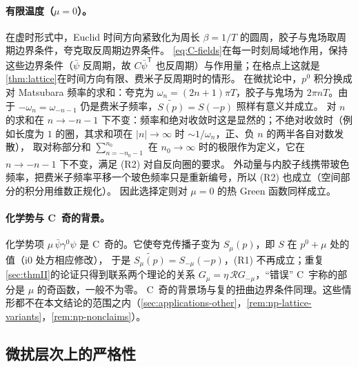 \documentclass[UTF8,a4paper,11pt,fontset=fandol]{ctexart}
\theoremstyle{cplain}
\theoremstyle{cdefinition}
\theoremstyle{cremark}
\numberwithin{equation}{section}
\newcommand{\tp}{\mathsf{T}}                         %
\newcommand{\Rop}{\mathcal{R}}                       %
\newcommand{\ii}{\mathrm{i}}                        %
\newcommand{\Cconj}[1]{\widetilde{#1}}              %
\begin{document}
\paragraph{有限温度（$\mu=0$）。}在虚时形式中，Euclid 时间方向紧致化为周长 $\beta=1/T$ 的圆周，胶子与鬼场取周期边界条件，夸克取反周期边界条件。
\cref{eq:C-fields}在每一时刻局域地作用，保持这些边界条件（$\bar\psi$ 反周期，故 $C\bar\psi^{\tp}$ 也反周期）与作用量；在格点上这就是\cref{thm:lattice}在时间方向有限、费米子反周期时的情形。
在微扰论中，$p^0$ 积分换成对 Matsubara 频率的求和：夸克为 $\omega_n=(2n+1)\pi T$，胶子与鬼场为 $2\pi nT$。由于 $-\omega_n=\omega_{-n-1}$ 仍是费米子频率，$\Cconj{S(p)}=S(-p)$ 照样有意义并成立。
对 $n$ 的求和在 $n\to-n-1$ 下不变：频率和绝对收敛时这是显然的；不绝对收敛时（例如长度为 $1$ 的圈，其求和项在 $|n|\to\infty$ 时 $\sim1/\omega_n$，正、负 $n$ 的两半各自对数发散），
取对称部分和 $\sum_{n=-n_0-1}^{n_0}$ 在 $n_0\to\infty$ 时的极限作为定义，它在 $n\to-n-1$ 下不变，满足 (R2) 对自反向圈的要求。
外动量与内胶子线携带玻色频率，把费米子频率平移一个玻色频率只是重新编号，所以 (R2) 也成立（空间部分的积分用维数正规化）。
因此选择定则对 $\mu=0$ 的热 Green 函数同样成立。

\paragraph{化学势与 C~奇的背景。}化学势项 $\mu\,\bar\psi\gamma^0\psi$ 是 C~奇的。它使夸克传播子变为 $S_\mu(p)$，即 $S$ 在 $p^0+\mu$ 处的值（$\ii0$ 处方相应修改），
于是 $\Cconj{S_\mu(p)}=S_{-\mu}(-p)$，(R1) 不再成立；重复\cref{sec:thmII}的论证只得到联系两个理论的关系 $G_\mu=\eta\,\Rop G_{-\mu}$，“错误” C~宇称的部分是 $\mu$ 的奇函数，一般不为零。
C~奇的背景场与复的扭曲边界条件同理。这些情形都不在本文结论的范围之内（\cref{sec:applications-other}，\cref{rem:np-lattice-variants}，\cref{rem:np-nonclaims}）。

\subsection{微扰层次上的严格性}\label{sec:reg-rigour}
\end{document}
